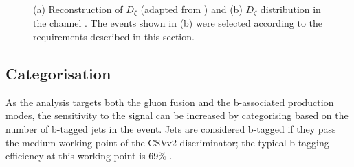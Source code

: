 \begin{figure}[h!]
\begin{center}
\end{center}
\caption[Reconstruction of the $D_{\zeta}$ variable and the $D_{\zeta}$ distribution
in the \emu channel.]{(a) Reconstruction of $D_{\zeta}$ (adapted from \cite{cdf-dzeta}) and (b) $D_{\zeta}$ distribution in the 
\emu channel \cite{CMS-PAS-HIG-16-037}. The events shown in (b) were selected according to the requirements described in this section.}
\label{fig:mssm_dzeta}
\end{figure}


\subsection{Categorisation}
\label{sec:mssm_eventsel_categories}
As the analysis targets both the gluon fusion
and the b-associated production modes, 
the sensitivity to the signal can be increased by categorising
based on the number of b-tagged jets in the event. Jets
are considered b-tagged if they pass the medium working point
of the \ac{CSV}v2 discriminator; the typical b-tagging efficiency at this
working point is 69\% \cite{cms-btag-run2}.

